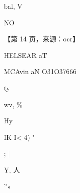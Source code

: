 \documentclass[UTF8,12pt,a4paper,openany]{ctexbook}
\begin{document}
\begin{enumerate}[label=\textbf{\arabic*.},leftmargin=2em]
\par bal, V\par NO\par \par 【第 14 页，来源：ocr】\par HELSEAR aT\par MCAvin aN O31O37666\par ty\par wv,              \%\par Hy\par IK I<       4)         "\par ;                                       |\par Y,           人\par ”»           
\end{enumerate}
\end{document}
